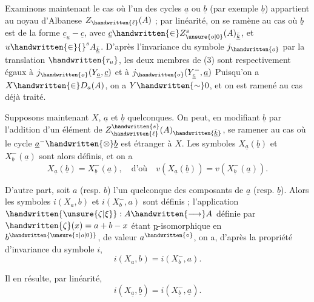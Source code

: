 Examinons maintenant le cas où l'un des cycles $\underline{a}$ ou $\underline{b}$ (par exemple $\underline{b}$) appartient au noyau d'Albanese $Z_{\handwritten{\ell}}(A)$ ; par linéarité, on se ramène au cas où $\underline{b}$ est de la forme $\underline{c}_u-\underline{c}$, avec $\underline{c}\handwritten{\in}Z^{s}_{\unsure{o|0}}(A)_{\bar{\underline{k}}}$, et $u\handwritten{\in}{}^{s}A_{\bar{\underline{k}}}$. D'après l'invariance du symbole $j_{\handwritten{o}}$ par la translation $\handwritten{\tau_u}$, les deux membres de (3) sont respectivement égaux à $j_{\handwritten{o}}(Y_{\underline{a}},\underline{c})$ et à $j_{\handwritten{o}}(Y^{-}_{\underline{c}},\underline{a})$ Puisqu'on a $X\handwritten{\in}D_a(A)$, on a $Y\handwritten{\sim}0$, et on est ramené au cas déjà traité.

Supposons maintenant $X$, $\underline{a}$ et $\underline{b}$ quelconques. On peut, en modifiant $\underline{b}$ par l'addition d'un élément de $Z^{\handwritten{s}}_{\handwritten{\ell}}(A)_{\handwritten{\bar{\underline{k}}}}$, se ramener au cas où le cycle $\underline{a}^{-}\handwritten{\otimes}\underline{b}$ est étranger à $X$. Les symboles $X_{\underline{a}}(\underline{b})$ et $X^{-}_{\underline{b}}(\underline{a})$ sont alors définis, et on a
\[
X_{\underline{a}}(\underline{b})=X^{-}_{\underline{b}}(\underline{a}),\quad\text{d'où}\quad v(X_{\underline{a}}(\underline{b}))=v(X^{-}_{\underline{b}}(\underline{a})).
\]

D'autre part, soit $a$ (resp. $b$) l'un quelconque des composants de $\underline{a}$ (resp. $\underline{b}$). Alors les symboles $i(X_a,b)$ et $i(X^{-}_b,a)$ sont définis ; l'application $\handwritten{\unsure{\zeta|\xi}}:A\handwritten{\longrightarrow}A$ définie par $\handwritten{\zeta}(x)=a+b-x$ étant \uline{p}-isomorphique en $b^{\handwritten{\unsure{\circ|o|0}}}$, de valeur $a^{\handwritten{\circ}}$, on a, d'après la propriété d'invariance du symbole $i$,
\[
i(X_a,b)=i(X^{-}_b,a).
\]

Il en résulte, par linéarité,
\[
i(X_{\underline{a}},\underline{b})=i(X^{-}_{\underline{b}},\underline{a}).
\]

